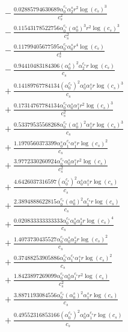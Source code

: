 \documentclass[10pt]{article}
\begin{document}
\begin{align*}
&{}  - \frac{0.02885794630689 \alpha_{0}^{c_s} \alpha_{2}^s r^{2} \log{\left(c_{s} \right)}^{3}}{c_{s}^{2}} \\
&{}  - \frac{0.11543178522756 \alpha_{0}^{c_s} \left(\alpha_{0}^s\right)^{3} r^{2} \log{\left(c_{s} \right)}^{3}}{c_{s}^{2}} \\
&{}  - \frac{0.11799405677595 \alpha_{0}^{c_s} \alpha_{0}^s r^{4} \log{\left(c_{s} \right)}}{c_{s}^{4}} \\
&{}  - \frac{0.94410483184306 \left(\alpha_{0}^s\right)^{2} \alpha_{2}^{c_s} r \log{\left(c_{s} \right)}}{c_{s}} \\
&{}  + \frac{0.14189767784134 \left(\alpha_{0}^{c_s}\right)^{2} \alpha_{0}^s \alpha_{1}^s r \log{\left(c_{s} \right)}^{3}}{c_{s}} \\
&{}  + \frac{0.17314767784134 \alpha_{0}^{c_s} \alpha_{0}^s \alpha_{1}^s r^{2} \log{\left(c_{s} \right)}^{3}}{c_{s}^{2}} \\
&{}  + \frac{0.53379535568268 \alpha_{0}^{c_s} \left(\alpha_{0}^s\right)^{2} \alpha_{1}^s r \log{\left(c_{s} \right)}^{3}}{c_{s}} \\
&{}  + \frac{1.1970560373399 \alpha_{0}^s \alpha_{1}^{c_s} \alpha_{1}^s r \log{\left(c_{s} \right)}^{2}}{c_{s}} \\
&{}  + \frac{3.9772330260924 \alpha_{0}^{c_s} \alpha_{0}^s \alpha_{1}^s r^{2} \log{\left(c_{s} \right)}}{c_{s}^{2}} \\
&{}  + \frac{4.6426037316597 \left(\alpha_{0}^{c_s}\right)^{2} \alpha_{0}^s \alpha_{1}^s r \log{\left(c_{s} \right)}}{c_{s}} \\
&{}  + \frac{2.3894888622815 \alpha_{0}^{c_s} \left(\alpha_{0}^s\right)^{2} \alpha_{1}^{c_s} r \log{\left(c_{s} \right)}}{c_{s}} \\
&{}  + \frac{0.020833333333333 \alpha_{0}^{c_s} \alpha_{0}^s \alpha_{2}^s r \log{\left(c_{s} \right)}^{4}}{c_{s}} \\
&{}  + \frac{1.4073730435527 \alpha_{0}^{c_s} \alpha_{0}^s \alpha_{2}^s r \log{\left(c_{s} \right)}^{2}}{c_{s}} \\
&{}  + \frac{0.37488253905886 \alpha_{0}^{c_s} \alpha_{1}^{c_s} \alpha_{1}^s r \log{\left(c_{s} \right)}^{2}}{c_{s}} \\
&{}  + \frac{1.8423897269099 \alpha_{0}^{c_s} \alpha_{0}^s \alpha_{1}^{c_s} r^{2} \log{\left(c_{s} \right)}}{c_{s}^{2}} \\
&{}  + \frac{3.8871193084556 \alpha_{0}^{c_s} \left(\alpha_{0}^s\right)^{2} \alpha_{1}^s r \log{\left(c_{s} \right)}}{c_{s}} \\
&{}  + \frac{0.49552316853166 \left(\alpha_{0}^{c_s}\right)^{2} \alpha_{0}^s \alpha_{1}^{c_s} r \log{\left(c_{s} \right)}}{c_{s}} \\

\end{align*}
\end{document}
